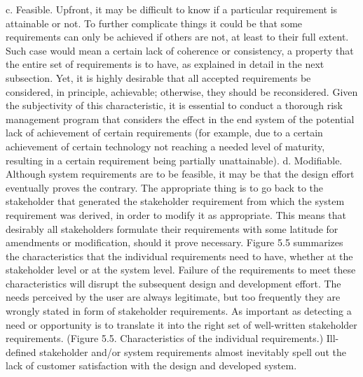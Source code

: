     c. Feasible. Upfront, it may be difficult to know if a particular requirement is attainable or not. To further complicate things it could be that some requirements can only be achieved if others are not, at least to their full extent. Such case would mean a certain lack of coherence or consistency, a property that the entire set of requirements is to have, as explained in detail in the next subsection. Yet, it is highly desirable that all accepted requirements be considered, in principle, achievable; otherwise, they should be reconsidered. Given the subjectivity of this characteristic, it is essential to conduct a thorough risk management program that considers the effect in the end system of the potential lack of achievement of certain requirements (for example, due to a certain achievement of certain technology not reaching a needed level of maturity, resulting in a certain requirement being partially unattainable).
    d. Modifiable. Although system requirements are to be feasible, it may be that the design effort eventually proves the contrary. The appropriate thing is to go back to the stakeholder that generated the stakeholder requirement from which the system requirement was derived, in order to modify it as appropriate. This means that desirably all stakeholders formulate their requirements with some latitude for amendments or modification, should it prove necessary.
Figure 5.5 summarizes the characteristics that the individual requirements need to have, whether at the stakeholder level or at the system level. Failure of the requirements to meet these characteristics will disrupt the subsequent design and development effort. The needs perceived by the user are always legitimate, but too frequently they are wrongly stated in form of stakeholder requirements. As important as detecting a need or opportunity is to translate it into the right set of well-written stakeholder requirements.
(Figure 5.5. Characteristics of the individual requirements.)
	Ill-defined stakeholder and/or system requirements almost inevitably spell out the lack of customer satisfaction with the design and developed system.

